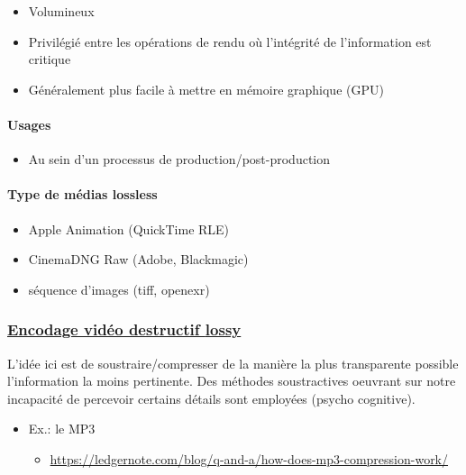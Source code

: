 \documentclass[
  french,
]{book}
\providecommand{\tightlist}{%
  \setlength{\itemsep}{0pt}\setlength{\parskip}{0pt}}
\begin{document}
\begin{itemize}
\tightlist
\item
  Volumineux
\item
  Privilégié entre les opérations de rendu où l'intégrité de l'information est critique
\item
  Généralement plus facile à mettre en mémoire graphique (GPU)
\end{itemize}

\hypertarget{usages-1}{%
\paragraph{Usages}\label{usages-1}}

\begin{itemize}
\tightlist
\item
  Au sein d'un processus de production/post-production
\end{itemize}

\hypertarget{type-de-muxe9dias-lossless}{%
\paragraph{Type de médias lossless}\label{type-de-muxe9dias-lossless}}

\begin{itemize}
\tightlist
\item
  Apple Animation (QuickTime RLE)
\item
  CinemaDNG Raw (Adobe, Blackmagic)
\item
  séquence d'images (tiff, openexr)
\end{itemize}

\hypertarget{encodage-viduxe9o-destructif-lossy}{%
\subsubsection{\texorpdfstring{\href{https://en.wikipedia.org/wiki/List_of_codecs\#Lossy_compression_2}{Encodage vidéo destructif \textbf{lossy}}}{Encodage vidéo destructif lossy}}\label{encodage-viduxe9o-destructif-lossy}}

L'idée ici est de soustraire/compresser de la manière la plus transparente possible l'information la moins pertinente.
Des méthodes soustractives oeuvrant sur notre incapacité de percevoir certains détails sont employées (psycho cognitive).

\begin{itemize}
\tightlist
\item
  Ex.: le MP3

  \begin{itemize}
  \tightlist
  \item
    \url{https://ledgernote.com/blog/q-and-a/how-does-mp3-compression-work/}
  \end{itemize}
\end{itemize}
\end{document}
